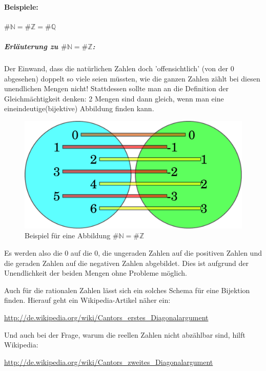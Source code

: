 \paragraph*{Beispiele:}
\begin{math}
\#{\mathbb N} = \#{\mathbb Z} = \#{\mathbb Q}
\end{math}
\subparagraph{Erläuterung zu \(\#{\mathbb N} = \#{\mathbb Z}\):}
Der Einwand, dass die natürlichen Zahlen doch 'offensichtlich' (von der 0 abgesehen) doppelt so viele seien müssten, wie die ganzen Zahlen zählt bei diesen unendlichen Mengen nicht!
Stattdessen sollte man an die Definition der Gleichmächtigkeit denken: 2 Mengen sind dann gleich, wenn man eine eineindeutige(bijektive) Abbildung finden kann.
\begin{figure}[b]
  \centering
  \caption{Beispiel für eine Abbildung \(\#{\mathbb N} = \#{\mathbb Z}\)}
  \includegraphics[scale=0.5]{../bilder/ngleichz.pdf}
\end{figure}
Es werden also die 0 auf die 0, die ungeraden Zahlen auf die positiven Zahlen und die geraden Zahlen auf die negativen Zahlen abgebildet. Dies ist aufgrund der Unendlichkeit der beiden Mengen ohne Probleme möglich.

Auch für die rationalen Zahlen lässt sich ein solches Schema für eine Bijektion finden.
Hierauf geht ein Wikipedia-Artikel näher ein:

\url{http://de.wikipedia.org/wiki/Cantors_erstes_Diagonalargument}

Und auch bei der Frage, warum die reellen Zahlen nicht abzählbar sind, hilft Wikipedia:

\url{http://de.wikipedia.org/wiki/Cantors_zweites_Diagonalargument}